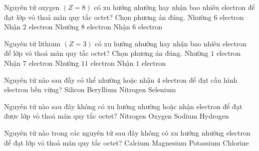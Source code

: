 \begin{ex}
	Nguyên tử oxygen $(Z=8)$ có xu hướng nhường hay nhận bao nhiêu electron để đạt lớp vỏ thoả mãn quy tắc octet? Chọn phương án đúng.
	\choice
	{Nhường $6$ electron}
	{\True Nhận $2$ electron}
	{Nhường $8$ electron}
	{Nhận $6$ electron}
\end{ex}
\begin{ex}
	Nguyên tử lithium $(Z=3)$ có xu hướng nhường hay nhận bao nhiêu electron để lớp vỏ thoả mãn quy tắc octet? Chọn phương án đúng.
	\choice
	{\True Nhường $1$ electron}
	{Nhận $7$ electron}
	{Nhường $11$ electron}
	{Nhận $1$ electron}
\end{ex}
\begin{ex}
	Nguyên tử nào sau đầy có thể nhường hoặc nhận $4$ electron để đạt cấu hình electron bền vững?
	\choice
	{\True Silicon}
	{Beryllium}
	{Nitrogen}
	{Selenium}
\end{ex}
\begin{ex}
	Nguyên tử nào sau đây không có xu hướng nhường hoặc nhận electron để đạt được lớp vỏ thoả mãn quy tắc octet?
	\choice
	{Nitrogen}
	{Oxygen}
	{Sodium}
	{\True Hydrogen}
\end{ex}
\begin{ex}
	Nguyên tử nào trong các nguyên tử sau đây không có xu hướng nhường electron để đạt lớp vỏ thoả mãn quy tắc octet?
	\choice
	{Calcium}
	{Magnesium}
	{Potassium}
	{\True Chlorine}
\end{ex}
